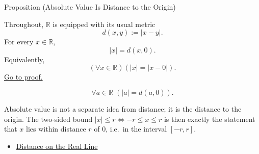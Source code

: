 \begin{propositionbox}{Proposition (Absolute Value Is Distance to the Origin)}
\begin{proposition}
\label{prop:abs-value-is-distance-to-zero}
Throughout, $\mathbb{R}$ is equipped with its usual metric
\[
  d(x,y):=|x-y|.
\]
For every $x\in\mathbb{R}$,
\[
  |x|=d(x,0).
\]
Equivalently,
\[
  (\forall x\in\mathbb{R})(|x|=|x-0|).
\]
\hyperref[prf:abs-value-is-distance-to-zero]{Go to proof.}
\end{proposition}
\end{propositionbox}
\begin{remark*}
\[
\forall a\in\mathbb{R}\;(|a|=d(a,0)).
\]
\end{remark*}
\begin{remark*}[Interpretation]
Absolute value is not a separate idea from distance; it is the distance to the origin. The two-sided bound $|x|\le r \Leftrightarrow -r\le x\le r$ is then exactly the statement that $x$ lies within distance $r$ of $0$, i.e.\ in the interval $[-r,r]$.
\end{remark*}
\begin{dependencies}
\begin{itemize}
  \item \hyperref[def:distance-on-real-line]{Distance on the Real Line}
\end{itemize}
\end{dependencies}
